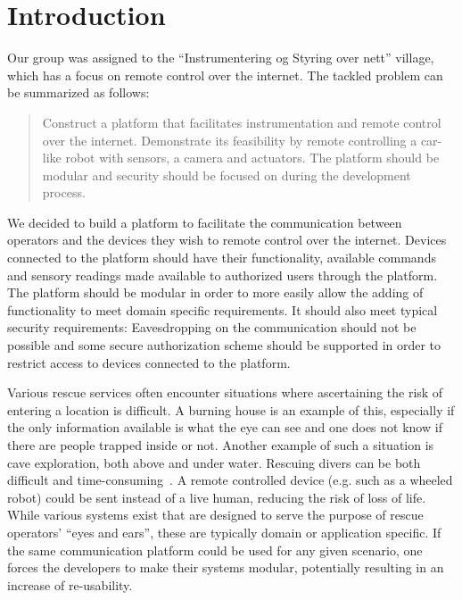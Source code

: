 \chapter{Introduction}
Our group was assigned to the ``Instrumentering og Styring over nett'' village, which has a focus on remote control over the internet.
The tackled problem can be summarized as follows:
\begin{quote}
Construct a platform that facilitates instrumentation and remote control over the internet.
Demonstrate its feasibility by remote controlling a car-like robot with sensors, a camera and actuators.
The platform should be modular and security should be focused on during the development process.
\end{quote}

We decided to build a platform to facilitate the communication between operators and the devices they wish to remote control over the internet.
Devices connected to the platform should have their functionality, available commands and sensory readings made available to authorized users through the platform.
The platform should be modular in order to more easily allow the adding of functionality to meet domain specific requirements.
It should also meet typical security requirements: Eavesdropping on the communication should not be possible and some secure authorization scheme should be supported in order to restrict access to devices connected to the platform.

Various rescue services often encounter situations where ascertaining the risk of entering a location is difficult. A burning house is an example of this, especially if the only information available is what the eye can see and one does not know if there are people trapped inside or not.
Another example of such a situation is cave exploration, both above and under water.
Rescuing divers can be both difficult and time-consuming~\citep{rana-divers}.
A remote controlled device (e.g. such as a wheeled robot) could be sent instead of a live human, reducing the risk of loss of life.
While various systems exist that are designed to serve the purpose of rescue operators' ``eyes and ears'', these are typically domain or application specific.
If the same communication platform could be used for any given scenario, one forces the developers to make their systems modular, potentially resulting in an increase of re-usability.


